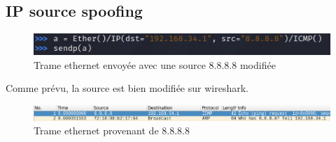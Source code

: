 \documentclass[12pt, oneside]{article}
\begin{document}
\subsection{IP source spoofing}
\begin{figure}[H]
\centering
\includegraphics[scale=0.4]{sendp2}
\caption{Trame ethernet envoyée avec une source 8.8.8.8 modifiée}
\end{figure}
Comme prévu, la source est bien modifiée sur wireshark.
\begin{figure}[H]
\centering
\includegraphics[scale=0.4]{wire2}
\caption{Trame ethernet provenant de 8.8.8.8}
\end{figure}
\end{document}
